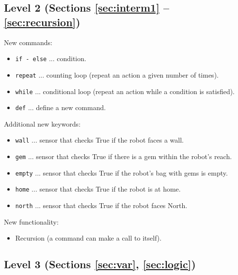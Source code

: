 \subsection{Level 2 (Sections \ref{sec:interm1} -- \ref{sec:recursion})}

New commands:
\begin{itemize}
\item {\tt if - else} ... condition.
\item {\tt repeat} ... counting loop (repeat an action a given number of times).
\item {\tt while} ... conditional loop (repeat an action while a condition is satisfied).
\item {\tt def} ... define a new command.
\end{itemize}
Additional new keywords:
\begin{itemize}
\item {\tt wall} ... sensor that checks True if the robot faces a wall.
\item {\tt gem} ... sensor that checks True if there is a gem within the robot's reach.
\item {\tt empty} ... sensor that checks True if the robot's bag with gems is empty.
\item {\tt home} ... sensor that checks True if the robot is at home.
\item {\tt north} ... sensor that checks True if the robot faces North.
\end{itemize}
New functionality:
\begin{itemize}
\item Recursion (a command can make a call to itself).
\end{itemize}

\subsection{Level 3 (Sections \ref{sec:var}, \ref{sec:logic})}

